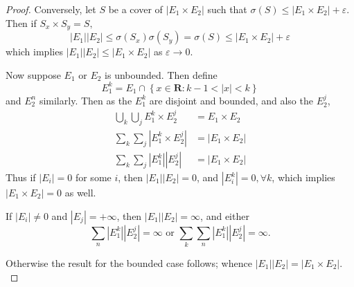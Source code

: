 \documentclass[12pt]{book}
\newcommand{\st}{\bf{:}}
\newcommand{\set}[1]{\left\{ #1 \right\}}
\renewcommand{\i}{\cap}
\newcommand{\bu}{\bigcup}
\newcommand{\cross}{\times}
\newcommand{\R}{\mathbf{R}}
\newcommand{\tor}{\text{ or }}
\renewcommand{\.}{\mkern1mu}
\newcounter{case}
\newcommand{\e}{\varepsilon}
\newcommand{\abs}[1]{\left| #1 \right|}
\newenvironment{pf}{\begin{proof}\setlength{\parindent}{\normalparindent}\setlength{\parskip}{\normalparskip}}{\end{proof}}
\theoremstyle{theorem}
\renewcommand{\bf}[1]{\boldsymbol{#1}}
\newcommand{\mes}[1]{\abs{#1}}
\newlength{\normalparindent}
\newlength{\normalparskip}
\begin{document}
\begin{pf}
	Conversely, let $S$ be a cover of $\mes{E_1\cross E_2}$ such that $\sigma(S) \leq \mes{E_1\cross E_2} + \e.$ Then if $S_x \cross S_y = S,$
			\[ \mes{E_1}\mes{E_2} \leq \sigma(S_x)\sigma(S_y) = \sigma(S) \leq \mes{E_1\cross E_2} + \e \]
	which implies $\mes{E_1}\mes{E_2} \leq \mes{E_1\cross E_2}$ as $\e\to 0$.
		
	Now suppose $E_1$ or $E_2$ is unbounded. Then define 
			\[ E_1^k = E_1 \i \set{x\in\R \st k-1 < \abs{x} < k } \]
	and $E_2^n$ similarly. Then as the $E_1^k$ are disjoint and bounded, and also the $E_2^j$, 
		\begin{align*}
		\bu_k\bu_j E_1^k \cross E_2^j &= E_1 \cross E_2\\
		\sum_k \sum_j \mes{E_1^k\cross E_2^j} &= \mes{E_1\cross E_2}\\
		\sum_k \sum_j \mes{E_1^k}\mes{E_2^j} &= \mes{E_1\cross E_2} 
		\end{align*}		 
	Thus if $\mes{E_i} = 0$ for some $i$, then $\mes{E_1}\mes{E_2} = 0$, and $\mes{E_i^k} = 0, \forall k$, which implies $\mes{E_1 \cross E_2}= 0$ as well.
	
	If $\mes{E_i}\neq 0$ and $\mes{E_j} = +\infty$, then $\mes{E_1}\mes{E_2} = \infty$, and either
		\[ \sum_n\mes{E_1^k}\mes{E_2^j} = \infty \tor \sum_k\sum_n\mes{E_1^k}\mes{E_2^j} = \infty. \]
	
	Otherwise the result for the bounded case follows; whence $\mes{E_1}\mes{E_2} = \mes{E_1 \cross E_2}.$
	\end{pf}
	
\end{document}
